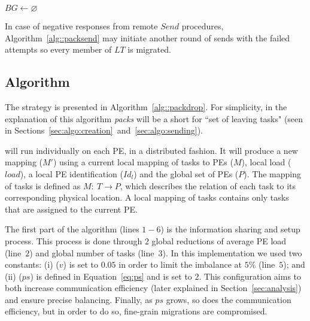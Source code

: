 \begin{algorithm}[t]
    \DontPrintSemicolon
    $BG \gets \varnothing$ \\
    \caption{\batchsend}  
    \label{alg::packsend}
\end{algorithm}

In case of negative responses from remote $Send$ procedures, Algorithm~\ref{alg::packsend} may initiate another round of sends with the failed attempts so every member of $LT$ is migrated.

\subsection{\packdrop Algorithm} \label{sec:algo:main}

The \packdrop strategy is presented in Algorithm~\ref{alg::packdrop}.
For simplicity, in the explanation of this algorithm \textit{packs} will be a short for ``set of leaving tasks" (seen in Sections~\ref{sec:algo:creation}~and~\ref{sec:algo:sending}).

\packdrop will run individually on each PE, in a distributed fashion. 
It will produce a new mapping ($M'$) using a current local mapping of tasks to PEs ($M$), local load ($load$), a local PE identification ($Id_l$) and the global set of PEs ($P$).
The mapping of tasks is defined as $M:\ T \rightarrow P$, which describes the relation of each task to its corresponding physical location.
A local mapping of tasks contains only tasks that are assigned to the current PE.

The first part of the algorithm (lines $1-6$) is the information sharing and setup process. 
This process is done through $2$ global reductions of average PE load (line~$2$) and global number of tasks (line~$3$).
In this implementation we used two constants: (i) ($v$) is set to $0.05$ in order to limit the imbalance at $5\%$ (line~$5$); and (ii) ($ps$) is defined in Equation~\ref{eq:ps} and is set to $2$.
This configuration aims to both increase communication efficiency (later explained in Section~\ref{sec:analysis}) and ensure precise balancing.
Finally, as $ps$ grows, so does the communication efficiency, but in order to do so, fine-grain migrations are compromised.

